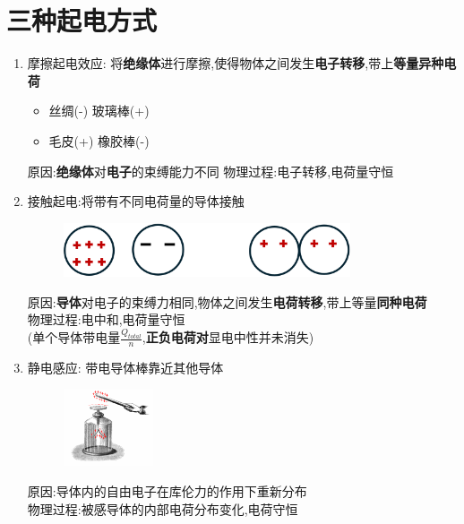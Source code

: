 \documentclass{article}
\begin{document}
    \section{三种起电方式}
    \begin{enumerate}
        \item 摩擦起电效应: 将\textbf{绝缘体}进行摩擦,使得物体之间发生\textbf{电子转移},带上\textbf{等量异种电荷}
            \begin{itemize}[label={}]
                \item 丝绸(-) 玻璃棒(+)   
                \item 毛皮(+) 橡胶棒(-)   
            \end{itemize}
        原因:\textbf{绝缘体}对\textbf{电子}的束缚能力不同 
        物理过程:电子转移,电荷量守恒

        \item 接触起电:将带有不同电荷量的导体接触
        \begin{figure}[h]
            \centering
            \includegraphics[width=0.8\textwidth]{./pictures/1.png}
        \end{figure}

        原因:\textbf{导体}对电子的束缚力相同,物体之间发生\textbf{电荷转移},带上等量\textbf{同种电荷}  \\    
        物理过程:电中和,电荷量守恒  \\
        (单个导体带电量$\frac{Q_{total}}{n}$,\textbf{正负电荷对}显电中性并未消失)

        \newpage

        \item 静电感应: 带电导体棒靠近其他导体
        \begin{figure}[h]
            \centering
            \includegraphics[width=0.25\textwidth]{./pictures/2.png}
        \end{figure}

        原因:导体内的自由电子在库伦力的作用下重新分布 \\
        物理过程:被感导体的内部电荷分布变化,电荷守恒        
    \end{enumerate}
\end{document}
